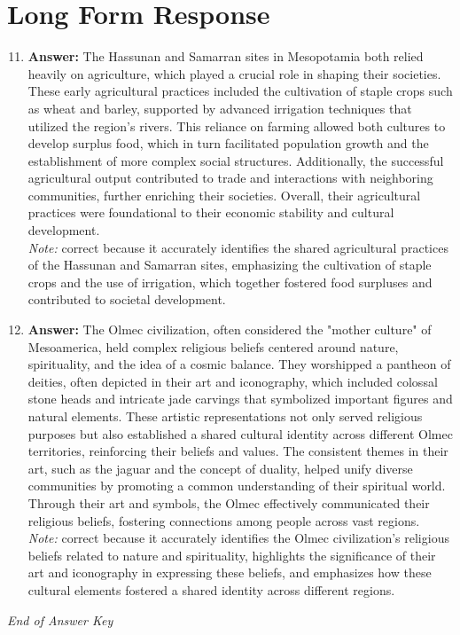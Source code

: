 \documentclass[12pt]{article}
\begin{document}
\section*{Long Form Response}
\begin{enumerate}[label=\arabic*.]
\setcounter{enumi}{10}
\item \textbf{Answer:} The Hassunan and Samarran sites in Mesopotamia both relied heavily on agriculture, which played a crucial role in shaping their societies. These early agricultural practices included the cultivation of staple crops such as wheat and barley, supported by advanced irrigation techniques that utilized the region's rivers. This reliance on farming allowed both cultures to develop surplus food, which in turn facilitated population growth and the establishment of more complex social structures. Additionally, the successful agricultural output contributed to trade and interactions with neighboring communities, further enriching their societies. Overall, their agricultural practices were foundational to their economic stability and cultural development.
\\ \textit{Note:} correct because it accurately identifies the shared agricultural practices of the Hassunan and Samarran sites, emphasizing the cultivation of staple crops and the use of irrigation, which together fostered food surpluses and contributed to societal development.
\item \textbf{Answer:} The Olmec civilization, often considered the "mother culture" of Mesoamerica, held complex religious beliefs centered around nature, spirituality, and the idea of a cosmic balance. They worshipped a pantheon of deities, often depicted in their art and iconography, which included colossal stone heads and intricate jade carvings that symbolized important figures and natural elements. These artistic representations not only served religious purposes but also established a shared cultural identity across different Olmec territories, reinforcing their beliefs and values. The consistent themes in their art, such as the jaguar and the concept of duality, helped unify diverse communities by promoting a common understanding of their spiritual world. Through their art and symbols, the Olmec effectively communicated their religious beliefs, fostering connections among people across vast regions.
\\ \textit{Note:} correct because it accurately identifies the Olmec civilization's religious beliefs related to nature and spirituality, highlights the significance of their art and iconography in expressing these beliefs, and emphasizes how these cultural elements fostered a shared identity across different regions.
\end{enumerate}

\vfill
\noindent\textit{End of Answer Key}
\end{document}
